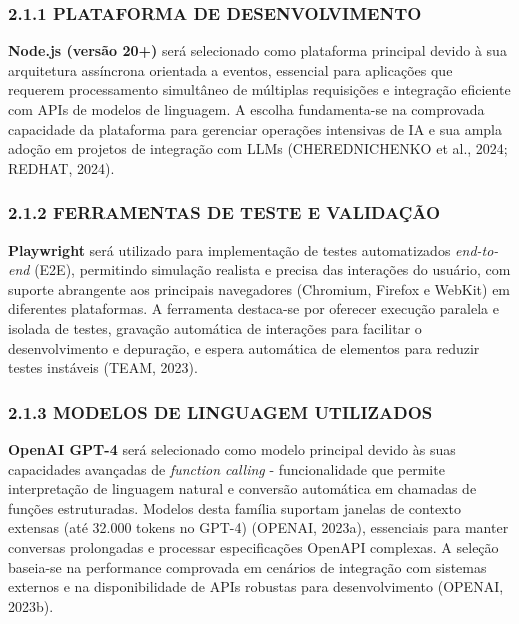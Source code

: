 \documentclass[
]{article}
\begin{document}
\subsubsection{2.1.1 PLATAFORMA DE
DESENVOLVIMENTO}\label{plataforma-de-desenvolvimento}

\textbf{Node.js (versão 20+)} será selecionado como plataforma principal
devido à sua arquitetura assíncrona orientada a eventos, essencial para
aplicações que requerem processamento simultâneo de múltiplas
requisições e integração eficiente com APIs de modelos de linguagem. A
escolha fundamenta-se na comprovada capacidade da plataforma para
gerenciar operações intensivas de IA e sua ampla adoção em projetos de
integração com LLMs (CHEREDNICHENKO et al., 2024; REDHAT, 2024).

\subsubsection{2.1.2 FERRAMENTAS DE TESTE E
VALIDAÇÃO}\label{ferramentas-de-teste-e-validauxe7uxe3o}

\textbf{Playwright} será utilizado para implementação de testes
automatizados \emph{end-to-end} (E2E), permitindo simulação realista e
precisa das interações do usuário, com suporte abrangente aos principais
navegadores (Chromium, Firefox e WebKit) em diferentes plataformas. A
ferramenta destaca-se por oferecer execução paralela e isolada de
testes, gravação automática de interações para facilitar o
desenvolvimento e depuração, e espera automática de elementos para
reduzir testes instáveis (TEAM, 2023).

\subsubsection{2.1.3 MODELOS DE LINGUAGEM
UTILIZADOS}\label{modelos-de-linguagem-utilizados}

\textbf{OpenAI GPT-4} será selecionado como modelo principal devido às
suas capacidades avançadas de \emph{function calling} - funcionalidade
que permite interpretação de linguagem natural e conversão automática em
chamadas de funções estruturadas. Modelos desta família suportam janelas
de contexto extensas (até 32.000 tokens no GPT-4) (OPENAI, 2023a),
essenciais para manter conversas prolongadas e processar especificações
OpenAPI complexas. A seleção baseia-se na performance comprovada em
cenários de integração com sistemas externos e na disponibilidade de
APIs robustas para desenvolvimento (OPENAI, 2023b).
\end{document}
